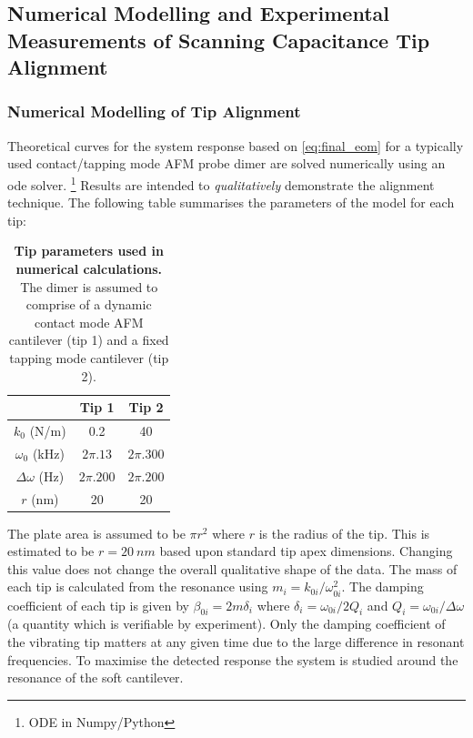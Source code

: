 \documentclass{article}
\begin{document}
\subsection{Numerical Modelling and Experimental Measurements of Scanning Capacitance Tip Alignment}

\subsubsection{Numerical Modelling of Tip Alignment}

Theoretical curves for the system response based on \eqref{eq:final_eom} for a typically used contact/tapping mode AFM probe dimer are solved numerically using an \gls{ode} solver.%
\footnote{ODE in Numpy/Python}
Results are intended to \textit{qualitatively} demonstrate the alignment technique.
The following table summarises the parameters of the model for each tip:
\begin{table}[H]
\begin{center}
\begin{tabular}{c | c | c}
\hline
& \textbf{Tip 1} & \textbf{Tip 2} \\
\hline                 
$k_0$ (N/m) & 0.2 & 40 \\
$\omega_0$ (kHz) & $2\pi.13$ & $2\pi.300$ \\
$\Delta\omega$ (Hz) & $2\pi.200$ & $2\pi.200$ \\
$r$ (nm) & 20 & 20 \\
\hline 
\end{tabular}
\end{center}
\caption[Tip parameters used in numerical calculations]{\textbf{Tip parameters used in numerical calculations.} The dimer is assumed to comprise of a dynamic contact mode AFM cantilever (tip 1) and a fixed tapping mode cantilever (tip 2).}
\vspace{-10pt}
\end{table}
The plate area is assumed to be $\pi r^2$ where $r$ is the radius of the tip. This is estimated to be $r=\SI{20}{nm}$ based upon standard tip apex dimensions. Changing this value does not change the overall qualitative shape of the data. The mass of each tip is calculated from the resonance using $m_i = k_{0i}/\omega_{0i}^2$. The damping coefficient of each tip is given by $\beta_{0i} = 2m\delta_i$ where $\delta_i = \omega_{0i}/2Q_i$ and $Q_i = \omega_{0i}/\Delta\omega$ (a quantity which is verifiable by experiment). Only the damping coefficient of the vibrating tip matters at any given time due to the large difference in resonant frequencies. To maximise the detected response the system is studied around the resonance of the soft cantilever.
\end{document}

